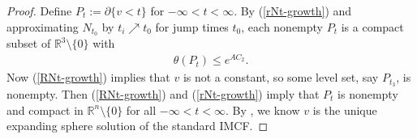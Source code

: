 \documentclass[11pt, letterpaper]{amsart}
\theoremstyle{definition}
\theoremstyle{remark}
\begin{document}
\begin{appendix}
\begin{proof}
	Define $P_t := \partial \{ v< t\} $ for $-\infty< t< \infty$. By (\ref{rNt-growth}) and approximating $N_{t_0}$ by $t_i \nearrow t_0$ for jump times $t_0$, each nonempty $P_t$ is a compact subset of $\mathbb{R}^{3}\setminus \{0\} $ with
	\begin{align*}
		\theta (P_t) \leq e ^{A C_2}.
	\end{align*} 
	Now (\ref{RNt-growth}) implies that $v$ is not a constant, so some level set, say $P_{t_3}$, is nonempty. Then (\ref{RNt-growth}) and (\ref{rNt-growth}) imply that $P_t$ is nonempty and compact in $\mathbb{R}^{n}\setminus \{ 0\} $ for all $-\infty< t< \infty$. By \cite[Proposition 7.2]{HI01}, we know $v$ is the unique expanding sphere solution of the standard IMCF. 

\end{proof}




\end{appendix}






\end{document}
